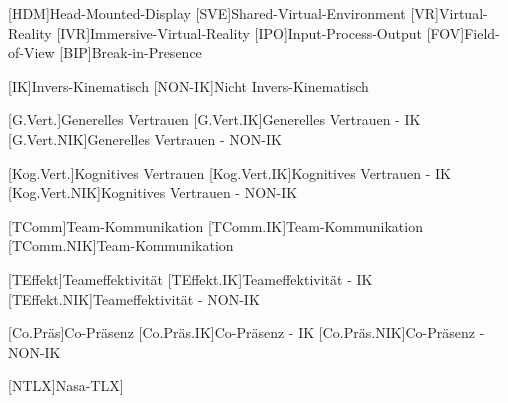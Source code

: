 \begin{acronym}
	[HDM]{Head-Mounted-Display}
	[SVE]{Shared-Virtual-Environment}
	[VR]{Virtual-Reality}
	[IVR]{Immersive-Virtual-Reality}
	[IPO]{Input-Process-Output}
	[FOV]{Field-of-View}
	[BIP]{Break-in-Presence}
	
	[IK]{Invers-Kinematisch}
	[NON-IK]{Nicht Invers-Kinematisch}
	
	[G.Vert.]{Generelles Vertrauen}
	[G.Vert.IK]{Generelles Vertrauen - IK}
	[G.Vert.NIK]{Generelles Vertrauen - NON-IK}
	
	[Kog.Vert.]{Kognitives Vertrauen}
	[Kog.Vert.IK]{Kognitives Vertrauen - IK}
	[Kog.Vert.NIK]{Kognitives Vertrauen - NON-IK}
	
	[TComm]{Team-Kommunikation}
	[TComm.IK]{Team-Kommunikation}
	[TComm.NIK]{Team-Kommunikation}
	
	[TEffekt]{Teameffektivität}
	[TEffekt.IK]{Teameffektivität - IK}
	[TEffekt.NIK]{Teameffektivität - NON-IK}
	
	[Co.Präs]{Co-Präsenz}
	[Co.Präs.IK]{Co-Präsenz - IK}
	[Co.Präs.NIK]{Co-Präsenz - NON-IK}
	
	[NTLX]{Nasa-TLX]}
\end{acronym}

